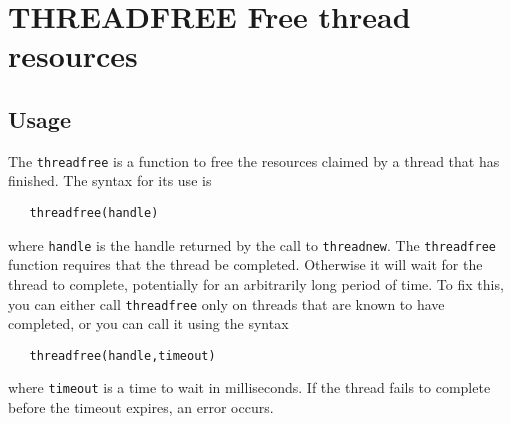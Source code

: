 \section{THREADFREE Free thread resources}

\subsection{Usage}

The \verb|threadfree| is a function to free the resources claimed
by a thread that has finished.  The syntax for its use is
\begin{verbatim}
   threadfree(handle)
\end{verbatim}
where \verb|handle| is the handle returned by the call to \verb|threadnew|.
The \verb|threadfree| function requires that the thread be completed.  
Otherwise it will wait for the thread to complete, potentially 
for an arbitrarily long period of time.  To fix this, you can
either call \verb|threadfree| only on threads that are known to have
completed, or you can call it using the syntax
\begin{verbatim}
   threadfree(handle,timeout)
\end{verbatim}
where \verb|timeout| is a time to wait in milliseconds.  If the thread
fails to complete before the timeout expires, an error occurs.

